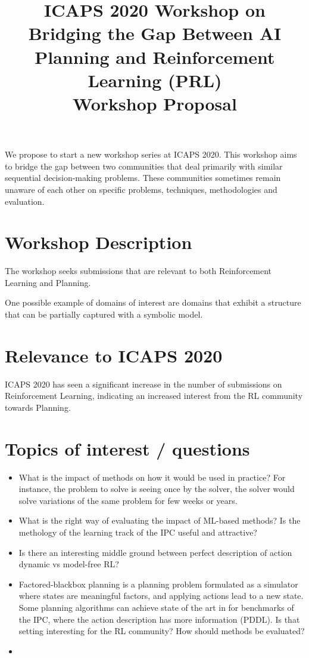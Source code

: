 \documentclass[10pt]{article}
\begin{document}
\title{ICAPS 2020 Workshop on \\ Bridging the Gap Between AI Planning and Reinforcement Learning (PRL)\\ \vspace*{0.7cm} Workshop Proposal
}
\date{}

\author{}

\maketitle


We propose to start a new workshop series at ICAPS 2020. This workshop aims to bridge the gap between two communities that deal primarily with similar sequential decision-making problems. These communities sometimes remain unaware of each other on specific problems, techniques,  methodologies and evaluation.

\section*{Workshop Description}

The workshop seeks submissions that are relevant to both Reinforcement Learning
and Planning. 


One possible example of domains of interest are domains that exhibit a structure
that can be partially captured with a symbolic model.



\section*{Relevance to ICAPS 2020}
ICAPS 2020 has seen a significant increase in the number of submissions on Reinforcement Learning, indicating an increased interest from the RL community towards Planning.

\section*{Topics of interest / questions}

\begin{itemize}
\item What is the impact of methods on how it would be used in practice? For instance, the problem to solve is seeing once by the solver, the solver would solve variations of the same problem for few weeks or years. 
\item What is the right way of evaluating the impact of ML-based methods? Is the methology of the learning track of the IPC useful and attractive?
\item Is there an interesting middle ground between perfect description of action dynamic vs model-free RL?
\item Factored-blackbox planning is a planning problem formulated as a simulator where states are meaningful factors, and applying actions lead to a new state. Some planning algorithms can achieve state of the art in for benchmarks of the IPC, where the action description has more information (PDDL). Is that setting interesting for the RL community? How should methods be evaluated?
\item 
\end{itemize}
\end{document}
